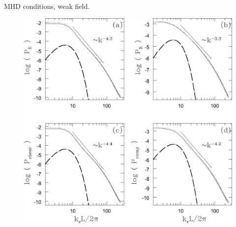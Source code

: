 \documentclass[12pt]{article}
\begin{document}
    \clearpage
    MHD conditions, weak field. \cite{2003ApJ...590..858V}
        \begin{figure}[hb]
                  \centering
                  \includegraphics[totalheight=80 mm]{img/Vestuto_weakfield.eps}
        \end{figure} 
    \clearpage
\end{document}
